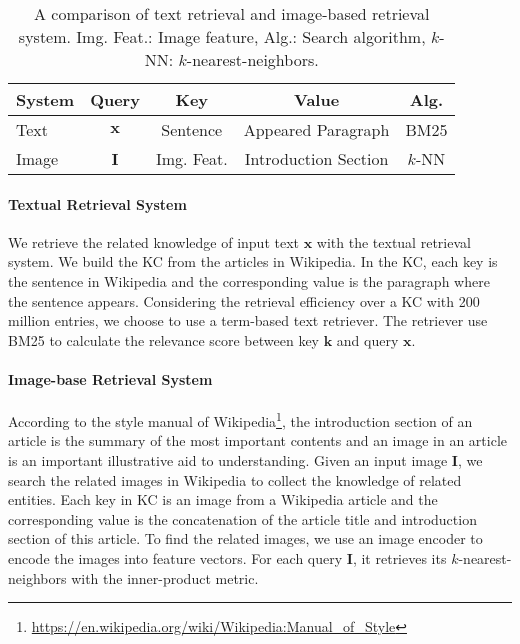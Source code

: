 \documentclass[11pt]{article}
\def\vk{{\bm{k}}}
\def\vx{{\bm{x}}}
\def\mI{{\bm{I}}}
\begin{document}
\begin{table}[t!]
\small
\setlength\tabcolsep{3pt}
\centering
\begin{tabular}{l|cccc}
\toprule
\textbf{System} & \textbf{Query} & \textbf{Key} & \textbf{Value}  & \textbf{Alg.}    \\
\midrule
Text & $\vx$ & Sentence & Appeared Paragraph & BM25 \\
Image & $\mI$ & Img. Feat. & Introduction Section & $k$-NN \\
\bottomrule
\end{tabular}
\caption{A comparison of text retrieval and image-based retrieval system. Img. Feat.: Image feature, Alg.: Search algorithm, $k$-NN: $k$-nearest-neighbors.}
\label{tab:retrieval}
\end{table}

\paragraph{Textual Retrieval System} 
We retrieve the related knowledge of input text $\vx$ with the textual retrieval system. We build the KC from the articles in Wikipedia. In the KC, each key is the sentence in Wikipedia and the corresponding value is the paragraph where the sentence appears. Considering the retrieval efficiency over a KC with 200 million entries, we choose to use a term-based text retriever. The retriever use BM25 \cite{robertson1995okapi} to calculate the relevance score between key $\vk$ and query $\vx$. 

\paragraph{Image-base Retrieval System} 
According to the style manual of Wikipedia\footnote{\url{https://en.wikipedia.org/wiki/Wikipedia:Manual_of_Style}}, the introduction section of an article is the summary of the most important contents and an image in an article is an important illustrative aid to understanding. Given an input image $\mI$, we search the related images in Wikipedia to collect the knowledge of related entities. Each key in KC is an image from a Wikipedia article and the corresponding value is the concatenation of the article title and introduction section of this article. To find the related images, we use an image encoder to encode the images into feature vectors. For each query $\mI$, it retrieves its $k$-nearest-neighbors with the inner-product metric.
\end{document}
